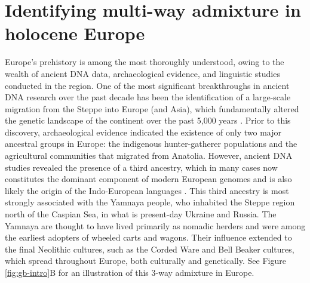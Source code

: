 \clearpage

\section{Identifying multi-way admixture in holocene Europe}
\label{sec:ch2-gb-real-eur}

Europe's prehistory is among the most thoroughly understood, owing to the wealth of ancient DNA data, archaeological evidence, and linguistic studies conducted in the region. One of the most significant breakthroughs in ancient DNA research over the past decade has been the identification of a large-scale migration from the Steppe into Europe (and Asia), which fundamentally altered the genetic landscape of the continent over the past 5,000 years \cite{haak2015massive}. Prior to this discovery, archaeological evidence indicated the existence of only two major ancestral groups in Europe: the indigenous hunter-gatherer populations and the agricultural communities that migrated from Anatolia. However, ancient DNA studies revealed the presence of a third ancestry, which in many cases now constitutes the dominant component of modern European genomes and is also likely the origin of the Indo-European languages \cite{lazaridis2024genetic}. This third ancestry is most strongly associated with the Yamnaya people, who inhabited the Steppe region north of the Caspian Sea, in what is present-day Ukraine and Russia. The Yamnaya are thought to have lived primarily as nomadic herders and were among the earliest adopters of wheeled carts and wagons. Their influence extended to the final Neolithic cultures, such as the Corded Ware and Bell Beaker cultures, which spread throughout Europe, both culturally and genetically. See Figure \ref{fig:gb-intro}B for an illustration of this 3-way admixture in Europe.

